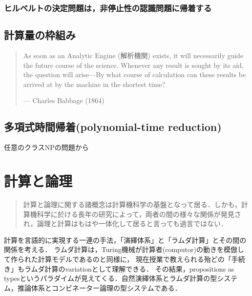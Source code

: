 \documentclass[uplatex, 12pt, dvipdfmx]{jsreport}
\begin{document}
\subsection{ヒルベルトの決定問題は，非停止性の認識問題に帰着する\cite{Turing-OnComputableNumbers}}

\section{計算量の枠組み}
\begin{quotation}
    As soon as an Analytic Engine (解析機関) exists, it will necessarily guide the future course of the science. Whenever any result is sought by its aid, the question will arise—By what course of calculation can these results be arrived at by the machine in the shortest time?
    
    \begin{flushright}
        — Charles Babbage (1864)
    \end{flushright}
\end{quotation}

\section{多項式時間帰着(polynomial-time reduction)}

\begin{definition}
    
\end{definition}

\begin{definition}
    任意のクラスNPの問題から
\end{definition}

\chapter{計算と論理}

\begin{quotation}
    計算と論理に関する諸概念は計算機科学の基盤となって居る．しかも，計算機科学に於ける長年の研究によって，両者の間の様々な関係が発見され，論理と計算はもはや一体化して居ると言っても過言ではない．
\end{quotation}

計算を言語的に実現する一連の手法，「演繹体系」と「ラムダ計算」とその間の関係を考える．
ラムダ計算は，Turing機械が計算者(computor)の動きを模倣して作られた計算モデルであるのと同様に，
現在授業で教えられる殆どの「手続き」もラムダ計算のvariationとして理解できる．
その結果，propositions as typesというパラダイムが見えてくる．自然演繹体系とラムダ計算の型システム，推論体系とコンビネーター論理の型システムである．
\end{document}
